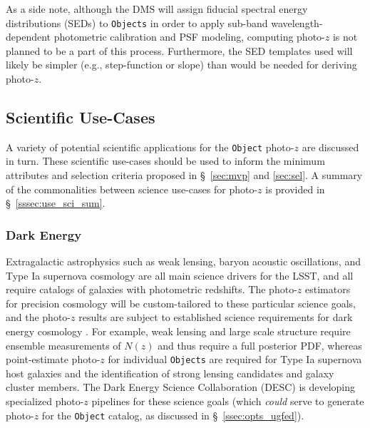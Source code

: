\documentclass[DM,lsstdraft,toc]{lsstdoc}
\begin{document}
As a side note, although the DMS will assign fiducial spectral energy distributions (SEDs) to {\tt Objects} in order to apply sub-band wavelength-dependent photometric calibration and PSF modeling, computing photo-$z$ is not planned to be a part of this process.
Furthermore, the SED templates used will likely be simpler (e.g., step-function or slope) than would be needed for deriving photo-$z$.

\subsection{Scientific Use-Cases}\label{ssec:use_sci}

A variety of potential scientific applications for the {\tt Object} photo-$z$ are discussed in turn. 
These scientific use-cases should be used to inform the minimum attributes and selection criteria proposed in \S~\ref{sec:mvp} and \ref{sec:sel}.
A summary of the commonalities between science use-cases for photo-$z$ is provided in \S~\ref{sssec:use_sci_sum}.

\subsubsection{Dark Energy}\label{sssec:use_sci_de}
Extragalactic astrophysics such as weak lensing, baryon acoustic oscillations, and Type Ia supernova cosmology are all main science drivers for the LSST, and all require catalogs of galaxies with photometric redshifts.
The photo-$z$ estimators for precision cosmology will be custom-tailored to these particular science goals, and the photo-$z$ results are subject to established science requirements for dark energy cosmology \citep{2018arXiv180901669T}.
For example, weak lensing and large scale structure require ensemble measurements of $N(z)$ and thus require a full posterior PDF, whereas point-estimate photo-$z$ for individual {\tt Objects} are required for Type Ia supernova host galaxies and the identification of strong lensing candidates and galaxy cluster members. 
The Dark Energy Science Collaboration (DESC) is developing specialized photo-$z$ pipelines for these science goals (which {\it could} serve to generate photo-$z$ for the {\tt Object} catalog, as discussed in \S~\ref{ssec:opts_ugfed}).
\end{document}
